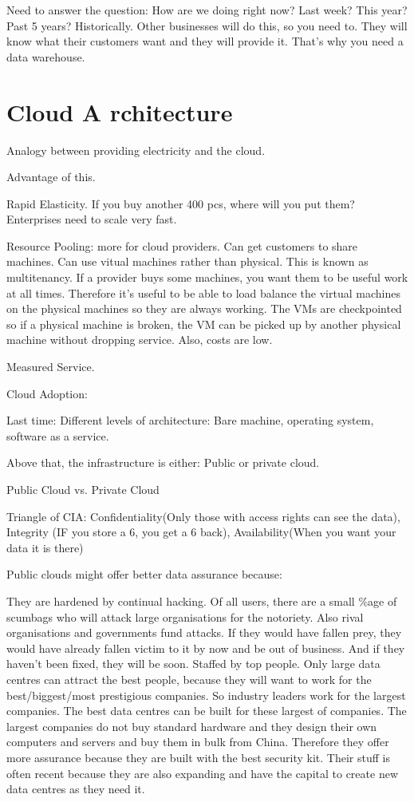 \documentclass[11pt]{article}
\begin{document}
Need to answer the question: How are we doing right now? Last week? This year? Past 5 years? Historically. Other businesses will do this, so you need to. They will know what their customers want and they will provide it. That’s why you need a data warehouse.


\section{Cloud A rchitecture}

Analogy between providing electricity and the cloud.

Advantage of this.

Rapid Elasticity. If you buy another 400 pcs, where will you put them? Enterprises need to scale very fast.

Resource Pooling: more for cloud providers. Can get customers to share machines. Can use vitual machines rather than physical. This is known as multitenancy. If a provider buys some machines, you want them to be useful work at all times. Therefore it’s useful to be able to load balance the virtual machines on the physical machines so they are always working. The VMs are checkpointed so if a physical machine is broken, the VM can be picked up by another physical machine without dropping service. Also, costs are low.

Measured Service.

Cloud Adoption:

Last time: Different levels of architecture: Bare machine, operating system, software as a service.

Above that, the infrastructure is either: Public or private cloud.

Public Cloud vs. Private Cloud

Triangle of CIA: Confidentiality(Only those with access rights can see the data), Integrity (IF you store a 6, you get a 6 back), Availability(When you want your data it is there)

Public clouds might offer better data assurance because:

They are hardened by continual hacking. Of all users, there are a small \%age of scumbags who will attack large organisations for the notoriety. Also rival organisations and governments fund attacks. If they would have fallen prey, they would have already fallen victim to it by now and be out of business. And if they haven’t been fixed, they will be soon.
Staffed by top people. Only large data centres can attract the best people, because they will want to work for the best/biggest/most prestigious companies. So industry leaders work for the largest companies.
The best data centres can be built for these largest of companies. The largest companies do not buy standard hardware and they design their own computers and servers and buy them in bulk from China. Therefore they offer more assurance because they are built with the best security kit. Their stuff is often recent because they are also expanding and have the capital to create new data centres as they need it.
\end{document}
